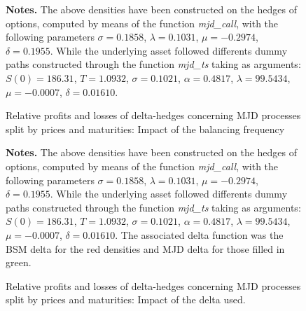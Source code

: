 \documentclass[a4paper, 12pt]{report}
\begin{document}
\begin{appendices}
\begin{figure}[h]
  \centering
  
  \caption{Relative profits and losses of delta-hedges concerning MJD processes split by prices and maturities: Impact of the balancing frequency}
  \begin{changemargin}{0.5cm}{0.5cm}
  \medskip
\footnotesize
{}\textbf{Notes.} The above densities have been constructed on the hedges of options, computed by means of the function \textit{mjd\_call}, with the following parameters $\sigma = 0.1858$, $\lambda = 0.1031$, $\mu = -0.2974$, $\delta = 0.1955$. While the underlying asset followed differents dummy paths constructed through the function \textit{mjd\_ts} taking as arguments: $S(0) = 186.31$, $T = 1.0932$, $\sigma = 0.1021$, $\alpha = 0.4817$, $\lambda = 99.5434$, $\mu = -0.0007$, $\delta = 0.01610$. 
  \end{changemargin}
  \label{p:analysis:mjd:pl:dist:big}
\end{figure}




\begin{figure}[h]
  \centering
  
  \caption{Relative profits and losses of delta-hedges concerning MJD processes split by prices and maturities: Impact of the delta used.}
  \begin{changemargin}{0.5cm}{0.5cm}
  \medskip
\footnotesize
{}\textbf{Notes.} The above densities have been constructed on the hedges of options, computed by means of the function \textit{mjd\_call}, with the following parameters $\sigma = 0.1858$, $\lambda = 0.1031$, $\mu = -0.2974$, $\delta = 0.1955$. While the underlying asset followed differents dummy paths constructed through the function \textit{mjd\_ts} taking as arguments: $S(0) = 186.31$, $T = 1.0932$, $\sigma = 0.1021$, $\alpha = 0.4817$, $\lambda = 99.5434$, $\mu = -0.0007$, $\delta = 0.01610$. The associated delta function was the BSM delta for the red densities and MJD delta for those filled in green.
  \end{changemargin}
  \label{p:analysis:mjd:pl:dist:deltas}
\end{figure}



\end{appendices}
\end{document}
